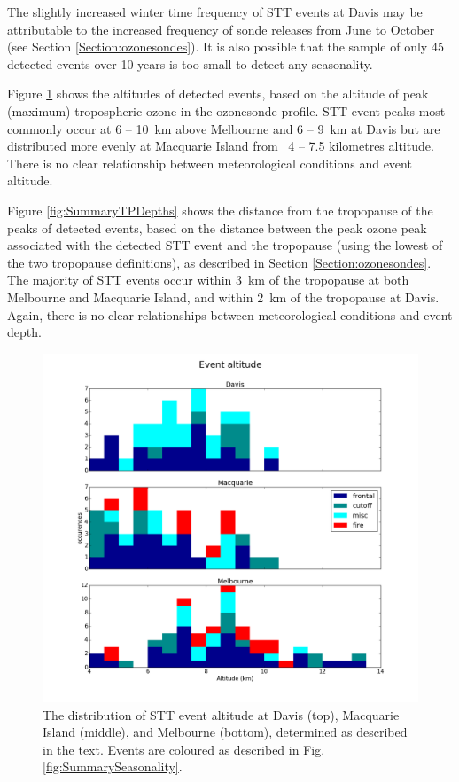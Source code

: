 \documentclass{article}
\begin{document}
  The slightly increased winter time frequency of STT events at Davis may be attributable to the increased frequency of sonde releases from June to October (see Section \ref{Section:ozonesondes}).
  It is also possible that the sample of only 45 detected events over 10 years is too small to detect any seasonality.

  Figure \ref{fig:SummaryAltitudes} shows the altitudes of detected events, based on the altitude of peak (maximum) tropospheric ozone in the ozonesonde profile.
  STT event peaks most commonly occur at 6 -- 10~km above Melbourne and 6 -- 9~km at Davis but are distributed more evenly at Macquarie Island from ~4 -- 7.5 kilometres altitude.
  There is no clear relationship between meteorological conditions and event altitude.

  Figure \ref{fig:SummaryTPDepths} shows the distance from the tropopause of the peaks of detected events, based on the distance between the peak ozone peak associated with the detected STT event and the tropopause (using the lowest of the two tropopause definitions), as described in Section \ref{Section:ozonesondes}.
  The majority of STT events occur within 3~km of the tropopause at both Melbourne and Macquarie Island, and within 2~km of the tropopause at Davis. 
  Again, there is no clear relationships between meteorological conditions and event depth.

  \begin{figure}[!htbp]
    \begin{center}
    \includegraphics[width=0.99\columnwidth]{figures/summary_altitude.png}
    \caption{The distribution of STT event altitude at Davis (top), Macquarie Island (middle), and Melbourne (bottom), determined as described in the text.
    Events are coloured as described in Fig. \ref{fig:SummarySeasonality}.}
    \label{fig:SummaryAltitudes}
    \end{center}
  \end{figure}
\end{document}
